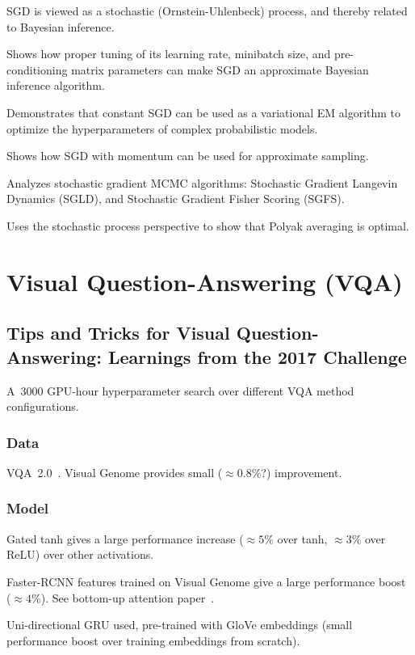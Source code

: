 \documentclass[a4paper, 12pt]{article}
\begin{document}
SGD is viewed as a stochastic (Ornstein-Uhlenbeck) process, and thereby related
to Bayesian inference.

Shows how proper tuning of its learning rate, minibatch size, and
pre-conditioning matrix parameters can make SGD an approximate Bayesian
inference algorithm.

Demonstrates that constant SGD can be used as a variational EM algorithm to
optimize the hyperparameters of complex probabilistic models.

Shows how SGD with momentum can be used for approximate sampling.

Analyzes stochastic gradient MCMC algorithms: Stochastic Gradient Langevin
Dynamics (SGLD), and Stochastic Gradient Fisher Scoring (SGFS).

Uses the stochastic process perspective to show that Polyak averaging is
optimal.


\section{Visual Question-Answering (VQA)}

\subsection{Tips and Tricks for Visual Question-Answering: Learnings from the
            2017 Challenge}

A~\num{3000} GPU-hour hyperparameter search over different VQA method
configurations.


\subsubsection{Data}

VQA~2.0~\citet{goyal2017making}. Visual Genome provides small
($\approx 0.8\%$?) improvement.


\subsubsection{Model}

Gated tanh gives a large performance increase ($\approx 5\%$ over tanh,
$\approx 3\%$ over ReLU) over other activations.

Faster-RCNN features trained on Visual Genome give a large performance boost
($\approx 4\%$).  See bottom-up attention paper~\citet{anderson2017bottom}.

Uni-directional GRU used, pre-trained with GloVe embeddings (small performance
boost over training embeddings from scratch).
\end{document}

